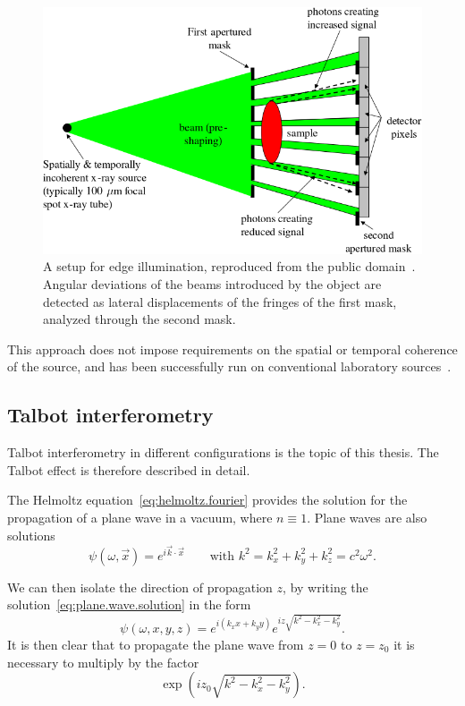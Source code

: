 \begin{figure}[htb]
    \centering
    \includegraphics[width=.7\textwidth]{gfx/edgeillumination.png}
    \caption[Edge illumination.]{A setup for edge illumination, reproduced
        from the public domain~\parencite{edge-illumination-picture}. Angular
        deviations of the beams introduced by the object are detected as
        lateral displacements of the fringes of the first mask, analyzed
        through the second mask.}
    \label{fig:edge-illumination}
\end{figure}

This approach does not impose requirements on the spatial or temporal
coherence of the source, and has been successfully run on conventional
laboratory sources~\parencite{Olivo2007}.

\subsection{Talbot interferometry}\label{sec:talbot-interferometry}
Talbot interferometry in different configurations is the topic of this
thesis. The Talbot effect is therefore described in detail.

The Helmoltz equation~\eqref{eq:helmoltz.fourier} provides the solution for
the propagation of a plane wave in a vacuum, where $n \equiv 1$. Plane waves
are also solutions
\begin{equation}
    \psi(\omega, \vec{x}) = e^{i\vec{k}\cdot \vec{x}} \qquad \text{with } k^2
    = k_x^2 + k_y^2 + k_z^2 = c^2 \omega^2.
    \label{eq:plane.wave.solution}
\end{equation}

We can then isolate the direction
of propagation $z$, by writing the solution~\eqref{eq:plane.wave.solution} in the form
\begin{equation}
    \psi(\omega, x, y, z) = e^{i(k_x x + k_y y)}e^{iz\sqrt{k^2 - k_x^2 -
    k_y^2}}.
    \label{eq:free.propagation}
\end{equation}
It is then clear that to propagate the plane wave from $z = 0$ to $z = z_0$
it is necessary to multiply by the factor
\begin{equation}
    \exp(iz_{0}\sqrt{k^2 - k_x^2 - k_y^2}).
    \label{eq:factor.propagator}
\end{equation}


